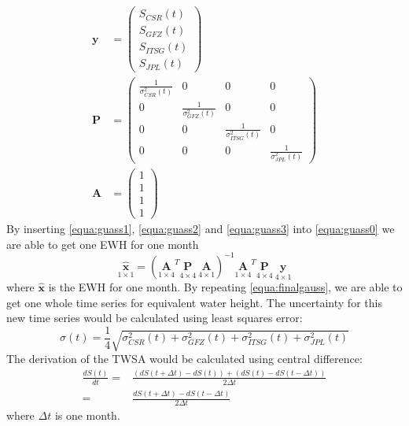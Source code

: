 \begin{align}
\bm{y} &= \begin{pmatrix} \label{equa:guass1}
S_{CSR}(t)\\
S_{GFZ}(t)\\
S_{ITSG}(t)\\
S_{JPL}(t)
\end{pmatrix} \\
\bm{P} &= \begin{pmatrix} \label{equa:guass2}
\frac{1}{\sigma^2_{CSR}(t)} & 0 & 0 & 0 \\
0 & \frac{1}{\sigma^2_{GFZ}(t)} & 0 & 0 \\
0 & 0 & \frac{1}{\sigma^2_{ITSG}(t)} & 0 \\
0 & 0 & 0 & \frac{1}{\sigma^2_{JPL}(t)}
\end{pmatrix}\\
\bm{A} &= \begin{pmatrix} \label{equa:guass3}
1\\
1\\
1\\
1
\end{pmatrix}
\end{align}
By inserting \autoref{equa:guass1}, \autoref{equa:guass2} and \autoref{equa:guass3} into \autoref{equa:guass0} we are able to get one EWH for one month
\begin{equation} \label{equa:finalgauss}
\underset{1 \times 1}{\hat{\bm{x}}} = (\underset{1 \times 4}{\bm{A}}^T \underset{4 \times 4}{\bm{P}} \  \underset{4 \times 1}{\bm{A}})^{-1} \underset{1 \times 4}{\bm{A}}^T \underset{4 \times 4}{\bm{P}} \  \underset{4 \times 1}{\bm{y}}
\end{equation}
where $\hat{\bm{x}}$ is the EWH for one month. By repeating \autoref{equa:finalgauss}, we are able to get one whole time series for equivalent water height. The uncertainty for this new time series would be calculated using least squares error:
\begin{equation}
	\sigma(t) = \frac{1}{4}\sqrt{\sigma^2_{CSR}(t)+\sigma^2_{GFZ}(t)+\sigma^2_{ITSG}(t)+\sigma^2_{JPL}(t)}
\end{equation}
The derivation of the TWSA would be calculated using central difference:
\begin{align}\label{eq:dsdt}
\frac{dS(t)}{dt} = &\frac{(dS(t+\Delta t) - dS(t)) + (dS(t) - dS(t-\Delta t))}{2 \Delta t}\\
= & \frac{dS(t+\Delta t) - dS(t-\Delta t)}{2 \Delta t}
\end{align}
where $\Delta t$ is one month. 
